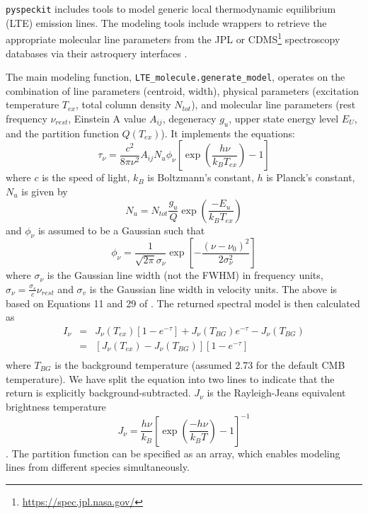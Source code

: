 \documentclass[twocolumn,linenumbers]{aastex63}
\newcommand{\pyspeckit}{\texttt{pyspeckit}\xspace}
\begin{document}
\pyspeckit includes tools to model generic local thermodynamic equilibrium (LTE) emission lines.
The modeling tools include wrappers to retrieve the appropriate molecular line parameters from the JPL \citep{Pickett1998} or CDMS\footnote{\url{https://spec.jpl.nasa.gov/}} \citep{Muller2005} spectroscopy databases via their astroquery interfaces \citep{Ginsburg2019}.

The main modeling function, \texttt{LTE\_molecule.generate\_model}, operates on the combination of line parameters (centroid, width), physical parameters (excitation temperature $T_{ex}$, total column density $N_{tot}$), and molecular line parameters (rest frequency $\nu_{rest}$, Einstein A value $A_{ij}$, degeneracy $g_u$, upper state energy level $E_U$, and the partition function $Q(T_{ex})$).
It implements the equations:
\begin{equation}
            \tau_\nu = \frac{c^2}{8 \pi \nu^2} A_{ij} N_u \phi_\nu
                    \left[ \exp\left( \frac{h \nu}{k_B T_{ex}} \right)  - 1 \right]
\end{equation}
where $c$ is the speed of light, $k_B$ is Boltzmann's constant, $h$ is Planck's constant, $N_u$ is given by
\begin{equation}
        N_{u} = N_{tot} \frac{g_u}{Q} \exp\left(\frac{-E_u}{k_B T_{ex}} \right)
\end{equation}
and $\phi_\nu$ is assumed to be a Gaussian such that
\begin{equation}
        \phi_\nu = \frac{1}{\sqrt{2 \pi} \sigma_\nu}
        \exp \left[ -\frac{(\nu-\nu_0)^2}{2 \sigma_\nu^2} \right]
\end{equation}
where $\sigma_\nu$ is the Gaussian line width (not the FWHM) in frequency units, $\sigma_\nu = \frac{\sigma_v}{c} \nu_{rest}$ and $\sigma_v$ is the Gaussian line width in velocity units.
The above is based on Equations 11 and 29 of \citet{Mangum2015}.
The returned spectral model is then calculated as 
\begin{equation}
    \begin{array}{lll}
    I_\nu & = & J_\nu(T_{ex}) \left[1 - e^{-\tau}\right] + J_\nu(T_{BG}) e^{-\tau}  - J_\nu(T_{BG})  \\
          & = & \left[J_\nu(T_{ex})-J_\nu(T_{BG})\right] \left[1 - e^{-\tau}\right] \\
    \end{array}
\end{equation}
where $T_{BG}$ is the background temperature (assumed 2.73 for the default CMB temperature).
We have split the equation into two lines to indicate that the return is explicitly background-subtracted.
$J_\nu$ is the Rayleigh-Jeans equivalent brightness temperature
\begin{equation}
    J_\nu = \frac{h \nu}{k_B} \left[\exp\left(\frac{-h \nu }{k_B T}\right) -1 \right]^{-1}
\end{equation}.
The partition function can be specified as an array, which enables modeling lines from different species simultaneously.
\end{document}
